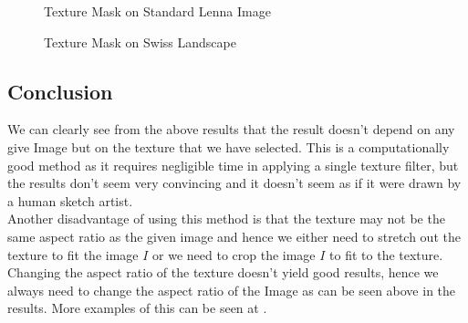 \documentclass{article}
\begin{document}
\begin{figure}[ht]
    \centering
    \qquad
    \label{fig:texture-flower-2}%
\end{figure}

\begin{figure}[ht]
    \centering
    \qquad
    \label{fig:texture-flower-rose}%
\end{figure}

\begin{figure}[ht]
    \centering
    \qquad
    \label{fig:texture-lenna}%
    \caption{Texture Mask on Standard Lenna Image}
\end{figure}

\begin{figure}[ht]
    \centering
    \qquad
    \label{fig:texture-swiss-1}%
    \caption{Texture Mask on Swiss Landscape}
\end{figure}

\clearpage
\subsection{Conclusion}
We can clearly see from the above results that the result doesn't depend on any give Image but on the   
texture that we have selected. This is a computationally good method as it requires negligible time in 
applying a single texture filter, but the results don't seem very convincing and it doesn't seem as if
it were drawn by a human sketch artist. \\

Another disadvantage of using this method is that the texture may not be the same aspect ratio as the
given image and hence we either need to stretch out the texture to fit the image $I$ or we need to crop 
the image $I$ to fit to the texture. Changing the aspect ratio of the texture doesn't yield good results,
hence we always need to change the aspect ratio of the Image as can be seen above in the results. More
examples of this can be seen at \cite{photo-funia-sketch-effect}. \\
\end{document}
